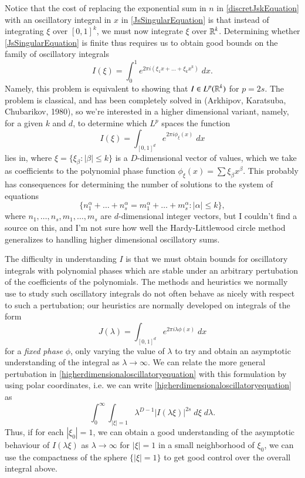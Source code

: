 %
Notice that the cost of replacing the exponential sum in $n$ in \eqref{discretJskEquation} with an oscillatory integral in $x$ in \eqref{JsSingularEquation} is that instead of integrating $\xi$ over $[0,1]^k$, we must now integrate $\xi$ over $\operatorname{\mathbb{R}}^k$. Determining whether \eqref{JsSingularEquation} is finite thus requires us to obtain good bounds on the family of oscillatory integrals
%
\begin{equation} \label{oscillatoryEquation}
	I(\xi) = \int_0^1 e^{2 \pi i (\xi_1 x + \dots + \xi_k x^k)}\; dx.
\end{equation}
%
Namely, this problem is equivalent to showing that $I \in L^p(\operatorname{\mathbb{R}}^k)$ for $p = 2s$. The problem is classical, and has been completely solved in (Arkhipov, Karatsuba, Chubarikov, 1980), so we're interested in a higher dimensional variant, namely, for a given $k$ and $d$, to determine which $L^p$ spaces the function
%
\begin{equation} \label{higherdimensionaloscillatoryequation}
	I(\xi) = \int_{[0,1]^d} e^{2 \pi i \phi_\xi(x)}\; dx
\end{equation}
%
lies in, where $\xi = \{ \xi_\beta : |\beta| \leq k \}$ is a $D$-dimensional vector of values, which we take as coefficients to the polynomial phase function $\phi_\xi(x) = \sum \xi_\beta x^\beta$. This probably has consequences for determining the number of solutions to the system of equations
%
\[ \{ n_1^\alpha + \dots + n_s^\alpha = m_1^\alpha + \dots + m_s^\alpha : |\alpha| \leq k \}, \]
%
where $n_1,\dots,n_s,m_1,\dots,m_s$ are $d$-dimensional integer vectors, but I couldn't find a source on this, and I'm not sure how well the Hardy-Littlewood circle method generalizes to handling higher dimensional oscillatory sums.

The difficulty in understanding $I$ is that we must obtain bounds for oscillatory integrals with polynomial phases which are stable under an arbitrary pertubation of the coefficients of the polynomials. The methods and heuristics we normally use to study such oscillatory integrals do not often behave as nicely with respect to such a pertubation; our heuristics are normally developed on integrals of the form
%
\[ J(\lambda) = \int_{[0,1]^d} e^{2 \pi i \lambda \phi(x)}\; dx \]
%
for a \emph{fixed phase} $\phi$, only varying the value of $\lambda$ to try and obtain an asymptotic understanding of the integral as $\lambda \to \infty$. We can relate the more general pertubation in \eqref{higherdimensionaloscillatoryequation} with this formulation by using polar coordinates, i.e. we can write \eqref{higherdimensionaloscillatoryequation} as
%
\[ \int_0^\infty \int_{|\xi| = 1}  \lambda^{D-1}|I(\lambda \xi)|^{2s}\; d\xi\; d\lambda. \]
%
Thus, if for each $|\xi_0| = 1$, we can obtain a good understanding of the asymptotic behaviour of $I(\lambda \xi)$ as $\lambda \to \infty$ for $|\xi| = 1$ in a small neighborhood of $\xi_0$, we can use the compactness of the sphere $\{ |\xi| = 1 \}$ to get good control over the overall integral above.

